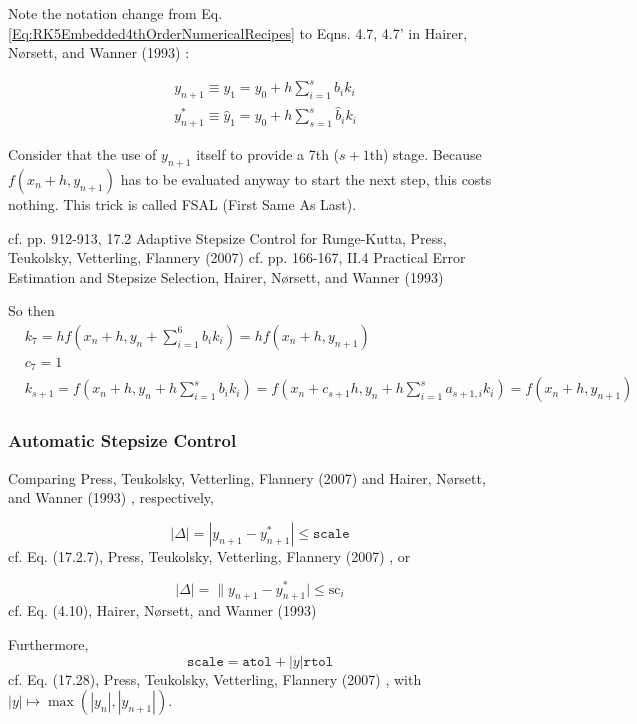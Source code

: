 \documentclass[10pt]{amsart}
\begin{document}
\begin{multicols*}{2}
Note the notation change from Eq. \ref{Eq:RK5Embedded4thOrderNumericalRecipes} to Eqns. 4.7, 4.7' in  Hairer, N\o rsett, and Wanner (1993) \cite{HNW1993}:

\[
\begin{aligned}
& y_{n+1} \equiv y_1  = y_0 + h \sum_{i=1}^s b_i k_i \\
& y_{n+1}^* \equiv \widehat{y}_1 = y_0 + h \sum_{s=1}^s \widehat{b}_i k_i
\end{aligned}
\]

Consider that the use of $y_{n+1}$ itself to provide a 7th ($s+1$th) stage. Because $f(x_n+h , y_{n+1})$ has to be evaluated anyway to start the next step, this costs nothing. This trick is called FSAL (First Same As Last).

cf. pp. 912-913, 17.2 Adaptive Stepsize Control for Runge-Kutta, Press, Teukolsky, Vetterling, Flannery (2007) \cite{PTVF2007}
cf. pp. 166-167, II.4 Practical Error Estimation and Stepsize Selection, Hairer, N\o rsett, and Wanner (1993) \cite{HNW1993}

So then
\[
\begin{aligned}
	& k_7 = h f(x_n + h, y_n + \sum_{i=1}^6 b_i k_i) = hf(x_n + h,y_{n+1}) \\
	& c_7 = 1 \\
	& k_{s+1} = f(x_n +h , y_n + h\sum_{i=1}^s b_i k_i) = f(x_n + c_{s+1}h , y_n + h\sum_{i=1}^s a_{s+1,i} k_i) = f(x_n + h,y_{n+1})
\end{aligned}
\]

\subsubsection{Automatic Stepsize Control}

Comparing Press, Teukolsky, Vetterling, Flannery (2007) \cite{PTVF2007} and Hairer, N\o rsett, and Wanner (1993) \cite{HNW1993}, respectively,

\begin{equation}
	|\Delta | = |y_{n+1} - y_{n+1}^* | \leq \texttt{scale}
\end{equation}
cf. Eq. (17.2.7), Press, Teukolsky, Vetterling, Flannery (2007) \cite{PTVF2007}, or

\begin{equation}
	| \Delta | = \| y_{n+1}- y^*_{n+1} | \leq \text{sc}_i
\end{equation}
cf. Eq. (4.10), Hairer, N\o rsett, and Wanner (1993) \cite{HNW1993}

Furthermore,
\begin{equation}
	\texttt{scale} = \texttt{atol} + |y| \texttt{rtol}
\end{equation}
cf. Eq. (17.28), Press, Teukolsky, Vetterling, Flannery (2007) \cite{PTVF2007}, with $|y| \mapsto \max{(|y_n|, |y_{n+1}|)}$.


\end{multicols*}
\end{document}
